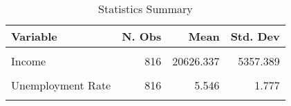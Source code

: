 \begin{table}[!h]

\caption{Statistics Summary}
\centering
\begin{tabular}[t]{l|r|r|r}
\hline
Variable & N. Obs & Mean & Std. Dev\\
\hline
\cellcolor{gray!6}{Crime Rate} & \cellcolor{gray!6}{816} & \cellcolor{gray!6}{0.049} & \cellcolor{gray!6}{0.015}\\
\hline
Income & 816 & 20626.337 & 5357.389\\
\hline
\cellcolor{gray!6}{Poverty Rate} & \cellcolor{gray!6}{816} & \cellcolor{gray!6}{13.062} & \cellcolor{gray!6}{4.104}\\
\hline
Unemployment Rate & 816 & 5.546 & 1.777\\
\hline
\cellcolor{gray!6}{Population} & \cellcolor{gray!6}{816} & \cellcolor{gray!6}{5031607.122} & \cellcolor{gray!6}{5548886.929}\\
\hline
\end{tabular}
\end{table}
